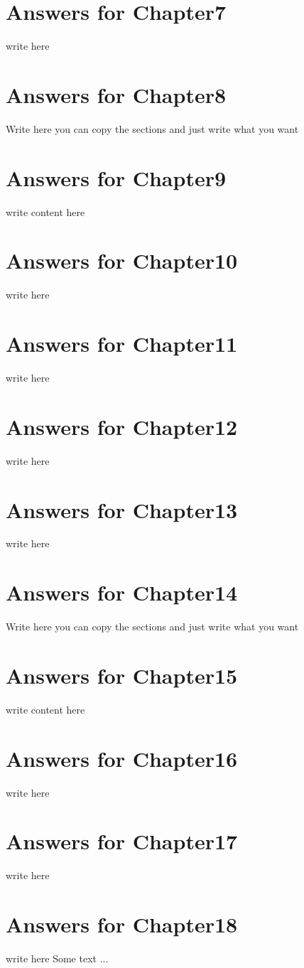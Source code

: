 \documentclass[a4paper,twoside]{scrbook}
\begin{document}
\section{Answers for Chapter7}\label{ch7}
write here
\section{Answers for Chapter8}\label{ch8}
Write here you can copy the sections and just write what you want
\section{Answers for Chapter9}\label{ch9}
write content here
\section{Answers for Chapter10}\label{ch10}
write here
\section{Answers for Chapter11}\label{ch11}
write here
\section{Answers for Chapter12}\label{ch12}
write here
\section{Answers for Chapter13}\label{ch13}
write here
\section{Answers for Chapter14}\label{ch14}
Write here you can copy the sections and just write what you want
\section{Answers for Chapter15}\label{ch15}
write content here
\section{Answers for Chapter16}\label{ch16}
write here
\section{Answers for Chapter17}\label{ch17}
write here
\section{Answers for Chapter18}\label{ch18}
write here
Some text ...
\end{document}
